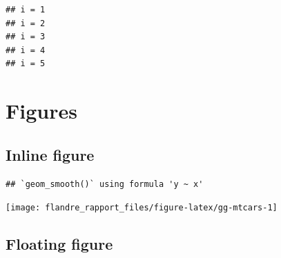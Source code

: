 \documentclass[twoside]{extreport}
\begin{document}
\begin{Shaded}
\begin{Highlighting}[]
 \SpecialCharTok{:}\NormalTok{) \{}
  \NormalTok{(}\NormalTok{)}
\NormalTok{\}}
\end{Highlighting}
\end{Shaded}

\begin{verbatim}
## i = 1 
## i = 2 
## i = 3 
## i = 4 
## i = 5
\end{verbatim}

\hypertarget{figures}{%
\chapter{Figures}\label{figures}}

\hypertarget{inline-figure}{%
\section{Inline figure}\label{inline-figure}}

\begin{Shaded}
\begin{Highlighting}[]
\NormalTok{(}
  \NormalTok{(}  
\NormalTok{) }\SpecialCharTok{+}
  \NormalTok{() }\SpecialCharTok{+} 
  \NormalTok{(} \NormalTok{)}
\end{Highlighting}
\end{Shaded}

\begin{verbatim}
## `geom_smooth()` using formula 'y ~ x'
\end{verbatim}

\begin{center}\texttt{[image: flandre\_rapport\_files/figure-latex/gg-mtcars-1]} \end{center}

\hypertarget{floating-figure}{%
\section{Floating figure}\label{floating-figure}}
\end{document}
